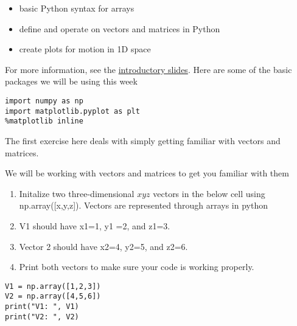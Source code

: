 \documentclass[%
oneside,                 %
final,                   %
10pt]{article}
\begin{document}
\begin{itemize}
\item basic Python syntax for arrays

\item define and operate on vectors and matrices in Python

\item create plots for motion in 1D space
\end{itemize}

\noindent
For more information, see the \href{{https://mhjensen.github.io/Physics321/doc/pub/week2/html/week2.html}}{introductory slides}.
Here are some of the basic packages we will be using this week




\begin{verbatim}
import numpy as np 
import matplotlib.pyplot as plt
%matplotlib inline

\end{verbatim}


The first exercise here deals with simply getting familiar with vectors and matrices.

We will be working with vectors and matrices to get you familiar with them

\begin{enumerate}
\item Initalize two three-dimensional $xyz$ vectors in the below cell using np.array([x,y,z]). Vectors are represented through arrays in python

\item V1 should have x1=1, y1 =2, and z1=3. 

\item Vector 2 should have x2=4, y2=5,  and z2=6. 

\item Print both vectors to make sure your code is working properly.
\end{enumerate}

\noindent





\begin{verbatim}
V1 = np.array([1,2,3])
V2 = np.array([4,5,6])
print("V1: ", V1)
print("V2: ", V2)

\end{verbatim}
\end{document}
